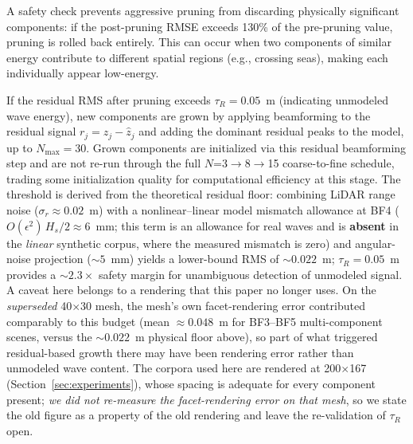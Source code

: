 \documentclass[review]{elsarticle}
\begin{document}
A safety check prevents aggressive pruning from discarding physically
significant components: if the post-pruning RMSE exceeds
130\% of the pre-pruning value, pruning is rolled back entirely.
This can occur when two components of similar energy
contribute to different spatial regions (e.g., crossing seas),
making each individually appear low-energy.

If the residual RMS after pruning exceeds $\tau_R = 0.05$~m
(indicating unmodeled wave energy), new components are grown by
applying beamforming to the residual signal $r_j = z_j - \hat{z}_j$
and adding the dominant residual peaks to the model, up to
$N_{\max}=30$. Grown components are initialized via this residual
beamforming step and are not re-run through the full $N$=3$\to$8$\to$15
coarse-to-fine schedule, trading some initialization quality for
computational efficiency at this stage.
The threshold is derived from the theoretical
residual floor: combining LiDAR range noise ($\sigma_r \approx
0.02$~m) with a nonlinear--linear model mismatch allowance at BF4
($O(\epsilon^2)\,H_s/2 \approx 6$~mm; this term is
an allowance for real waves and is \textbf{absent} in the \emph{linear} synthetic
corpus, where the measured mismatch is zero) and angular-noise projection
(${\sim}5$~mm) yields a lower-bound RMS of ${\sim}0.022$~m;
$\tau_R = 0.05$~m provides a ${\sim}2.3\times$ safety margin for
unambiguous detection of unmodeled signal.
A caveat here belongs to a rendering that this paper no longer uses. On the
\emph{superseded} 40$\times$30 mesh, the mesh's own facet-rendering error contributed
comparably to this budget (mean ${\approx}0.048$~m for BF3--BF5 multi-component
scenes, versus the ${\sim}0.022$~m physical floor above), so part of what triggered
residual-based growth there may have been rendering error rather than unmodeled wave
content. The corpora used here are rendered at 200$\times$167
(Section~\ref{sec:experiments}), whose spacing is adequate for every component present;
\emph{we did not re-measure the facet-rendering error on that mesh}, so we state the
old figure as a property of the old rendering and leave the re-validation of $\tau_R$
open.
\end{document}
